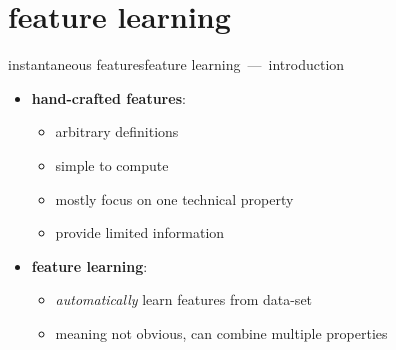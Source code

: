     \section[learned]{feature learning}
        \begin{frame}{instantaneous features}{feature learning~---~introduction}
            \begin{itemize}
                \item   \textbf{hand-crafted features}:
                    \begin{itemize}
                        \item   arbitrary definitions
                        \item   simple to compute
                        \item   mostly focus on one technical property
                        \item   provide limited information
                    \end{itemize}
                    
                \bigskip
                \item<2-> \textbf{feature learning}:
                    \begin{itemize}
                        \item   \textit{automatically} learn features from data-set
                        \item   meaning not obvious, can combine multiple properties
                        
                    \end{itemize}
            \end{itemize}
		\end{frame}

